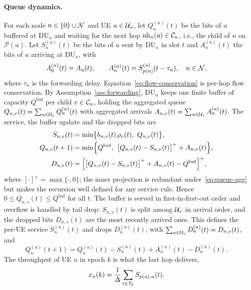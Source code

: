 \begin{EnChapter}
\paragraph{Queue dynamics.}
For each node $n \in \{0\} \cup \mathcal{N}$ and UE $u \in \mathcal{U}_n$, let $Q_n^{(u)}(t)$ be
the bits of $u$ buffered at DU$_n$ and waiting for the next hop
$\mathrm{nh}_n(u) \in \mathcal{C}_n$, i.e., the child of $n$ on $\mathcal{P}(u)$. Let
$S_n^{(u)}(t)$ be the bits of $u$ sent by DU$_n$ in slot $t$ and $A_n^{(u)}(t)$ the
bits of $u$ arriving at DU$_n$, with
\begin{equation}
  A_0^{(u)}(t) = A_u(t), \qquad
  A_n^{(u)}(t) = S_{p(n)}^{(u)}(t - \tau_n), \quad n \in \mathcal{N},
  \label{eq:flow-conservation}
\end{equation}
where $\tau_n$ is the forwarding delay. Equation~\eqref{eq:flow-conservation} is
per-hop flow conservation. By Assumption~\ref{ass:forwarding}, DU$_n$ keeps one
finite buffer of capacity $Q^{\mathrm{buf}}$ per child $v \in \mathcal{C}_n$, holding the
aggregated queue $Q_{n,v}(t) = \sum_{u \in \mathcal{U}_v} Q_n^{(u)}(t)$ with aggregated
arrivals $A_{n,v}(t) = \sum_{u \in \mathcal{U}_v} A_n^{(u)}(t)$. The service, the buffer
update and the dropped bits are
\begin{align}
  S_{n,v}(t) &= \min\bigl\{ b_{n,v}(t)\,\rho_v(t),\ Q_{n,v}(t) \bigr\}, \label{eq:queue-agg}\\
  Q_{n,v}(t+1) &= \min\Bigl\{ Q^{\mathrm{buf}},\ \bigl[Q_{n,v}(t) - S_{n,v}(t)\bigr]^{+} + A_{n,v}(t) \Bigr\}, \label{eq:queue}\\
  D_{n,v}(t) &= \Bigl[ \bigl[Q_{n,v}(t) - S_{n,v}(t)\bigr]^{+} + A_{n,v}(t) - Q^{\mathrm{buf}} \Bigr]^{+}, \label{eq:drop}
\end{align}
where $[\cdot]^{+} = \max\{\cdot, 0\}$; the inner projection is redundant
under~\eqref{eq:queue-agg} but makes the recursion well defined for any service
rule. Hence $0 \le Q_{n,v}(t) \le Q^{\mathrm{buf}}$ for all $t$. The buffer is served
in first-in-first-out order and overflow is handled by tail drop: $S_{n,v}(t)$ is
split among $\mathcal{U}_v$ in arrival order, and the dropped bits $D_{n,v}(t)$ are the
most recently arrived ones. This defines the per-UE service $S_n^{(u)}(t)$ and drops
$D_n^{(u)}(t)$, with $\sum_{u \in \mathcal{U}_v} D_n^{(u)}(t) = D_{n,v}(t)$, and
\begin{equation}
  Q_n^{(u)}(t+1) = Q_n^{(u)}(t) - S_n^{(u)}(t) + A_n^{(u)}(t) - D_n^{(u)}(t).
\end{equation}
The throughput of UE $u$ in epoch $k$ is what the last hop
delivers,
\begin{equation}
  x_u(k) = \frac{1}{\Delta} \sum_{t \in \mathcal{T}_k} S_{p(u),u}(t).
  \label{eq:ue-tput}
\end{equation}


\end{EnChapter}
